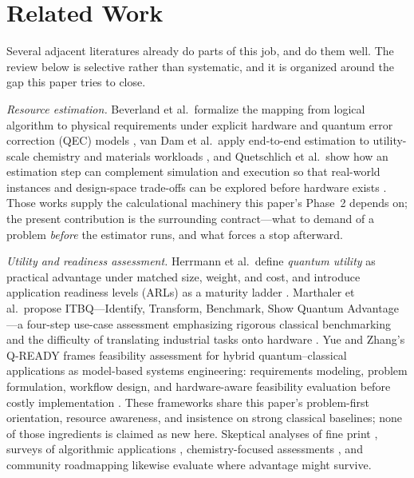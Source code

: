\section{Related Work}\label{sec:related}

Several adjacent literatures already do parts of this job, and do them well. The review below is selective rather than systematic, and it is organized around the gap this paper tries to close.

\emph{Resource estimation.} Beverland et al.\ formalize the mapping from logical algorithm to physical requirements under explicit hardware and quantum error correction (QEC) models \citep{beverland2022}, van Dam et al.\ apply end-to-end estimation to utility-scale chemistry and materials workloads \citep{vandam2024}, and Quetschlich et al.\ show how an estimation step can complement simulation and execution so that real-world instances and design-space trade-offs can be explored before hardware exists \citep{quetschlich2024resource}. Those works supply the calculational machinery this paper's Phase~2 depends on; the present contribution is the surrounding contract---what to demand of a problem \emph{before} the estimator runs, and what forces a stop afterward.

\emph{Utility and readiness assessment.} Herrmann et al.\ define \emph{quantum utility} as practical advantage under matched size, weight, and cost, and introduce application readiness levels (ARLs) as a maturity ladder \citep{herrmann2023}. Marthaler et al.\ propose ITBQ---Identify, Transform, Benchmark, Show Quantum Advantage---a four-step use-case assessment emphasizing rigorous classical benchmarking and the difficulty of translating industrial tasks onto hardware \citep{marthaler2025}. Yue and Zhang's Q-READY frames feasibility assessment for hybrid quantum--classical applications as model-based systems engineering: requirements modeling, problem formulation, workflow design, and hardware-aware feasibility evaluation before costly implementation \citep{yue2026qready}. These frameworks share this paper's problem-first orientation, resource awareness, and insistence on strong classical baselines; none of those ingredients is claimed as new here. Skeptical analyses of fine print \citep{aaronson2015}, surveys of algorithmic applications \citep{montanaro2016}, chemistry-focused assessments \citep{bauer2023prx}, and community roadmapping \citep{nqiworkshop2025,dimeglio2024} likewise evaluate where advantage might survive.

